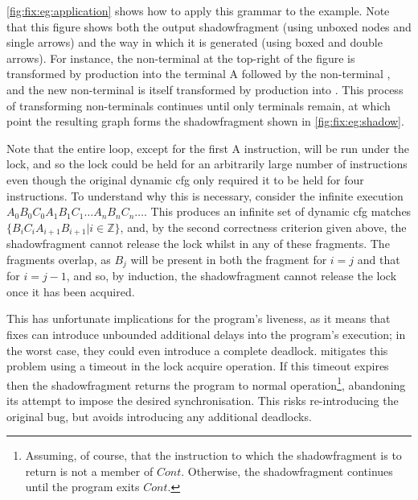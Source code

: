 \autoref{fig:fix:eg:application} shows how to apply this grammar to
the example.  Note that this figure shows both the output
\gls{shadowfragment} (using unboxed nodes and single arrows) and the
way in which it is generated (using boxed and double arrows).  For
instance, the 
non-terminal at the top-right of the figure is transformed by
production  into the terminal A followed by the
non-terminal , and
the new non-terminal is itself transformed by production
 into .  This process of transforming non-terminals
continues until only terminals remain, at which point the resulting
graph forms the \gls{shadowfragment} shown in
\autoref{fig:fix:eg:shadow}.

Note that the entire loop, except for the first A instruction, will be
run under the lock, and so the lock could be held for an arbitrarily
large number of instructions even though the original dynamic
\gls{cfg} only required it to be held for four instructions.  To
understand why this is necessary, consider the infinite execution
$A_0B_0C_0A_1B_1C_1{\ldots}A_nB_nC_n{\ldots}$.  This produces an
infinite set of dynamic \gls{cfg} matches $\{B_iC_iA_{i+1}B_{i+1} | i
\in \mathbb{Z}\}$, and, by the second correctness criterion given
above, the \gls{shadowfragment} cannot release the lock whilst in any
of these fragments.  The fragments overlap, as $B_j$ will be present
in both the fragment for $i=j$ and that for $i=j-1$, and so, by
induction, the \gls{shadowfragment} cannot release the lock once
it has been acquired.

This has unfortunate implications for the program's liveness, as it
means that {\technique} fixes can introduce unbounded additional
delays into the program's execution; in the worst case, they could
even introduce a complete deadlock.  {\Technique} mitigates this
problem using a timeout in the lock acquire operation.  If this
timeout expires then the \gls{shadowfragment} returns the program to
normal operation\footnote{Assuming, of course, that the instruction to
  which the \protect\gls{shadowfragment} is to return is not a member
  of $\mathit{Cont}$.  Otherwise, the \protect\gls{shadowfragment}
  continues until the program exits $\mathit{Cont}$.}, abandoning its
attempt to impose the desired synchronisation.  This risks
re-introducing the original bug, but avoids introducing any additional
deadlocks.

